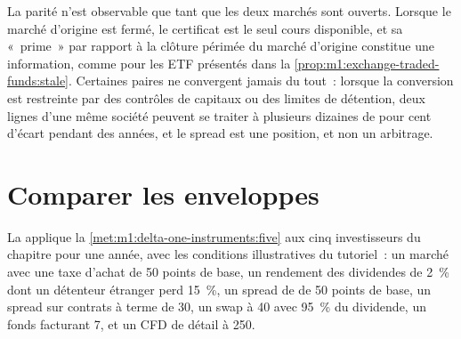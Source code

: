 \begin{omfigure}

\label{fig:m1:delta-one-instruments:band}
\end{omfigure}

La parité n'est observable que tant que les deux marchés sont ouverts. Lorsque le marché
d'origine est fermé, le certificat est le seul cours disponible, et sa «~prime~» par rapport
à la clôture périmée du marché d'origine constitue une information, comme pour les ETF présentés dans
la \cref{prop:m1:exchange-traded-funds:stale}. Certaines paires ne convergent jamais du tout~:
lorsque la conversion est restreinte par des contrôles de capitaux ou des limites de détention, deux
lignes d'une même société peuvent se traiter à plusieurs dizaines de pour cent d'écart pendant des années, et le
spread est une position, et non un arbitrage.

\section{Comparer les enveloppes}

La  applique la
\cref{met:m1:delta-one-instruments:five} aux cinq investisseurs du chapitre pour
une année, avec les conditions illustratives du tutoriel~: un marché avec une taxe
d'achat de 50 points de base, un rendement des dividendes de 2~\% dont un
détenteur étranger perd 15~\%, un spread de  de 50 points de base, un spread sur contrats à terme de 30, un
swap à 40 avec 95~\% du dividende, un fonds facturant 7, et un CFD de détail à
250.

